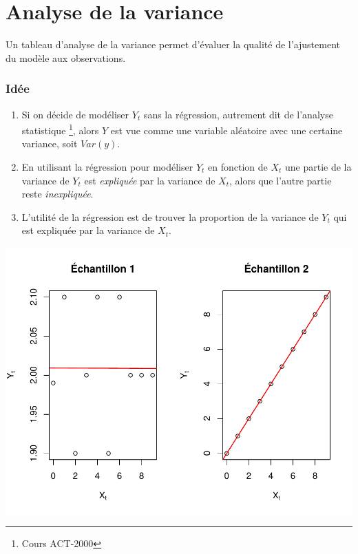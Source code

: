 \documentclass[11pt,french]{report}
\begin{document}
\section{Analyse de la variance}
\label{sec:anaVar}
Un tableau d'analyse de la variance permet d'évaluer la qualité de l'ajustement du modèle aux observations.

\subsubsection*{Idée}
\begin{enumerate}
\item Si on décide de modéliser $Y_t$ sans la régression, autrement dit de l'analyse statistique \footnote{Cours ACT-2000}, alors $Y$ est vue comme une variable aléatoire avec une certaine variance, soit $Var(y)$.
\item En utilisant la régression pour modéliser $Y_t$ en fonction de $X_t$ une partie de la variance de $Y_t$ est \emph{expliquée} par la variance de $X_t$, alors que l'autre partie reste \emph{inexpliquée}.
\item L'utilité de la régression est de trouver la proportion de la variance de $Y_t$ qui est expliquée par la variance de $X_t$.
\end{enumerate}

\includegraphics{notes_de_cours-011}
\end{document}
